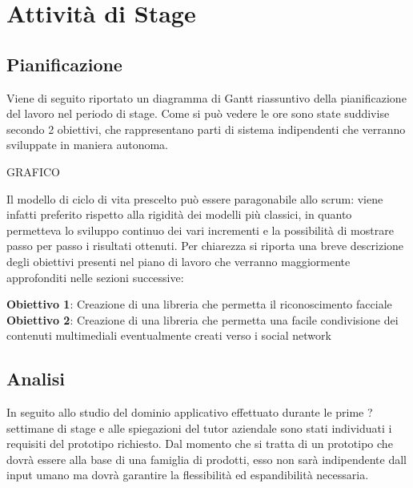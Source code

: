 
\chapter{Attività di Stage} %

\label{Chapter3} %



\section{Pianificazione}

Viene di seguito riportato un diagramma di Gantt riassuntivo della pianificazione
del lavoro nel periodo di stage. Come si può vedere le ore sono state suddivise secondo
2 obiettivi, che rappresentano parti di sistema indipendenti che verranno sviluppate
in maniera autonoma.

GRAFICO

Il modello di ciclo di vita prescelto può essere paragonabile allo scrum: viene infatti preferito rispetto alla rigidità dei modelli più classici, in
quanto permetteva lo sviluppo continuo dei vari incrementi e la possibilità di mostrare
passo per passo i risultati ottenuti. Per chiarezza si riporta una breve descrizione degli
obiettivi presenti nel piano di lavoro che verranno maggiormente approfonditi nelle
sezioni successive:

\textbf{Obiettivo 1}: Creazione di una libreria che permetta il riconoscimento facciale\\
\textbf{Obiettivo 2}: Creazione di una libreria che permetta una facile condivisione dei contenuti multimediali eventualmente creati verso i social network



\section{Analisi}

In seguito allo studio del dominio applicativo effettuato durante le prime ? settimane di stage e alle spiegazioni del tutor aziendale sono stati individuati i requisiti del prototipo richiesto.
Dal momento che si tratta di un prototipo che dovrà essere alla base di una famiglia di prodotti, esso non sarà indipendente dall input umano ma dovrà garantire la flessibilità ed espandibilità necessaria.

